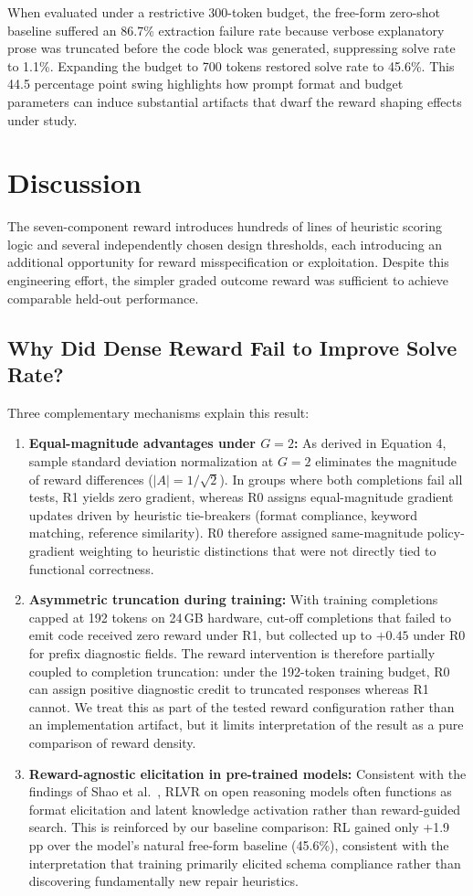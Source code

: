 \documentclass{article}
\begin{document}
When evaluated under a restrictive 300-token budget, the free-form zero-shot baseline suffered an 86.7\% extraction failure rate because verbose explanatory prose was truncated before the code block was generated, suppressing solve rate to 1.1\%. Expanding the budget to 700 tokens restored solve rate to 45.6\%. This 44.5 percentage point swing highlights how prompt format and budget parameters can induce substantial artifacts that dwarf the reward shaping effects under study.

\section{Discussion}
The seven-component reward introduces hundreds of lines of heuristic scoring logic and several independently chosen design thresholds, each introducing an additional opportunity for reward misspecification or exploitation. Despite this engineering effort, the simpler graded outcome reward was sufficient to achieve comparable held-out performance. 

\subsection{Why Did Dense Reward Fail to Improve Solve Rate?}
Three complementary mechanisms explain this result:
\begin{enumerate}
\item \textbf{Equal-magnitude advantages under $G=2$:} As derived in Equation 4, sample standard deviation normalization at $G=2$ eliminates the magnitude of reward differences ($|A| = 1/\sqrt{2}$). In groups where both completions fail all tests, R1 yields zero gradient, whereas R0 assigns equal-magnitude gradient updates driven by heuristic tie-breakers (format compliance, keyword matching, reference similarity). R0 therefore assigned same-magnitude policy-gradient weighting to heuristic distinctions that were not directly tied to functional correctness.
\item \textbf{Asymmetric truncation during training:} With training completions capped at 192 tokens on 24\,GB hardware, cut-off completions that failed to emit code received zero reward under R1, but collected up to $+0.45$ under R0 for prefix diagnostic fields. The reward intervention is therefore partially coupled to completion truncation: under the 192-token training budget, R0 can assign positive diagnostic credit to truncated responses whereas R1 cannot. We treat this as part of the tested reward configuration rather than an implementation artifact, but it limits interpretation of the result as a pure comparison of reward density.
\item \textbf{Reward-agnostic elicitation in pre-trained models:} Consistent with the findings of Shao et al.~\cite{Shao2025Spurious}, RLVR on open reasoning models often functions as format elicitation and latent knowledge activation rather than reward-guided search. This is reinforced by our baseline comparison: RL gained only +1.9 pp over the model's natural free-form baseline (45.6\%), consistent with the interpretation that training primarily elicited schema compliance rather than discovering fundamentally new repair heuristics.
\end{enumerate}
\end{document}
